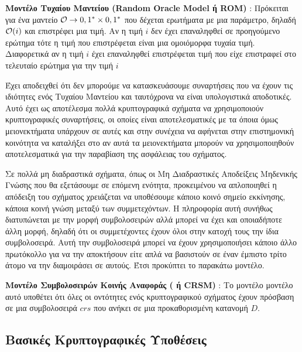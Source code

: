 \begin{definition}
\textbf{Μοντέλο Τυχαίου Μαντείου (Random Oracle Model ή ROM)} : Πρόκειται για ένα μαντείο $\mathcal{O} \rightarrow {0,1}^* \times {0,1}^*$ που δέχεται ερωτήματα με μια παράμετρο, δηλαδή $\mathcal{O}(i)$ και επιστρέφει μια τιμή. Αν η τιμή $i$ δεν έχει επαναληφθεί σε προηγούμενο ερώτημα τότε η τιμή που επιστρέφεται είναι μια ομοιόμορφα τυχαία τιμή. Διαφορετικά αν η τιμή $i$ έχει επαναληφθεί επιστρέφεται τιμή που είχε επιστραφεί στο τελευταίο ερώτημα για την τιμή $i$ 
\end{definition}

Έχει αποδειχθεί ότι δεν μπορούμε να κατασκευάσουμε συναρτήσεις που να έχουν τις ιδιότητες ενός Τυχαίου Μαντείου και ταυτόχρονα να είναι υπολογιστικά αποδοτικές. Αυτό έχει ως αποτέλεσμα πολλά κρυπτογραφικά σχήματα να χρησιμοποιούν κρυπτογραφικές συναρτήσεις, οι οποίες είναι αποτελεσματικές με τα όποια όμως μειονεκτήματα υπάρχουν σε αυτές και στην συνέχεια να αφήνεται στην επιστημονική κοινότητα να καταλήξει στο αν αυτά τα μειονεκτήματα μπορούν να χρησιμοποιηθούν αποτελεσματικά για την παραβίαση της ασφάλειας του σχήματος.

Σε πολλά μη διαδραστικά σχήματα, όπως οι Μη Διαδραστικές Αποδείξεις Μηδενικής Γνώσης που θα εξετάσουμε σε επόμενη ενότητα, προκειμένου να απλοποιηθεί η απόδειξη του σχήματος χρειάζεται να υποθέσουμε κάποιο κοινό σημείο εκκίνησης, κάποια κοινή γνώση μεταξύ των συμμετεχόντων. Η πληροφορία αυτή συνήθως διατυπώνεται με την μορφή συμβολοσειρών αλλά μπορεί να έχει και οποιαδήποτε άλλη μορφή, δηλαδή ότι οι συμμετέχοντες έχουν όλοι στην κατοχή τους την ίδια συμβολοσειρά. Αυτή την συμβολοσειρά μπορεί να έχουν χρησιμοποιήσει κάποιο άλλο πρωτόκολλο για να την αποκτήσουν είτε απλά να βασιστούν σε έναν έμπιστο τρίτο άτομο να την διαμοιράσει σε αυτούς. Έτσι προκύπτει το παρακάτω μοντέλο.

\begin{definition}
\textbf{Μοντέλο Συμβολοσειρών Κοινής Αναφοράς ( ή CRSM)} : Το μοντέλο μοντέλο αυτό υποθέτει ότι όλες οι οντότητες ενός κρυπτογραφικού σχήματος έχουν πρόσβαση σε μια συμβολοσειρά $crs$ που ανήκει σε μια προκαθορισμένη κατανομή $D$.
\end{definition}

\subsection{Βασικές Κρυπτογραφικές Υποθέσεις}

